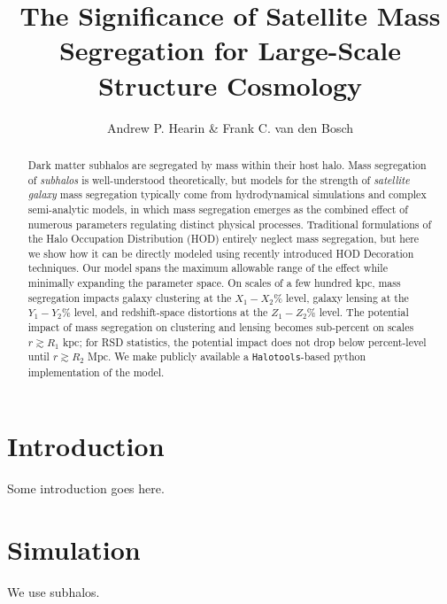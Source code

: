 \documentclass[usenatbib,usegraphicx,letterpaper]{mn2e}
\begin{document}
\title[Forward-Modeling Satellite Mass Segregation]
{The Significance of Satellite Mass Segregation for Large-Scale Structure Cosmology}

\author[Hearin \& van den Bosch]{Andrew P. Hearin \& Frank C. van den Bosch}

\maketitle

\begin{abstract}
Dark matter subhalos are segregated by mass within their host halo. Mass segregation of {\em subhalos} is well-understood theoretically, but models for the strength of {\em satellite galaxy} mass segregation typically come from hydrodynamical simulations and complex semi-analytic models, in which mass segregation emerges as the combined effect of numerous parameters regulating distinct physical processes. Traditional formulations of the Halo Occupation Distribution (HOD) entirely neglect mass segregation, but here we show how it can be directly modeled using recently introduced HOD Decoration techniques. Our model spans the maximum allowable range of the effect while minimally expanding the parameter space. On scales of a few hundred kpc, mass segregation impacts galaxy clustering at the $X_1-X_2\%$ level, galaxy lensing at the $Y_1-Y_2\%$ level, and redshift-space distortions at the $Z_1-Z_2\%$ level. The potential impact of mass segregation on clustering and lensing becomes sub-percent on scales $r\gtrsim R_1$ kpc; for RSD statistics, the potential impact does not drop below percent-level until $r\gtrsim R_2$ Mpc. We make publicly available a {\tt Halotools}-based python implementation of the model. %

\end{abstract}

\section{Introduction}
Some introduction goes here.

\section{Simulation}
We use  \citet{rockstar} subhalos. 

 

\end{document}
